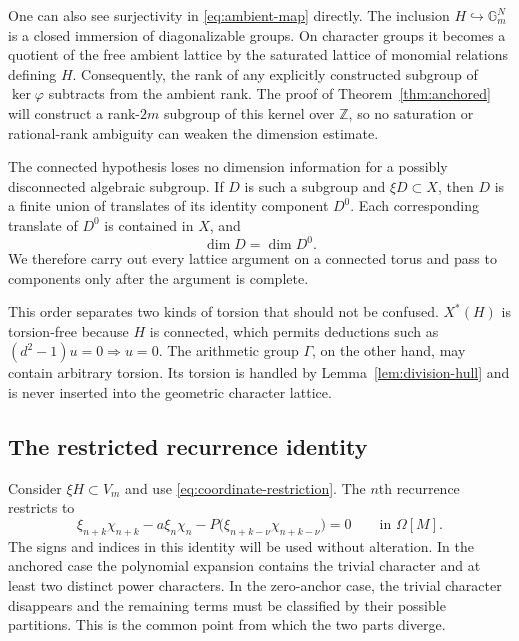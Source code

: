 \documentclass[11pt]{article}
\theoremstyle{definition}
\theoremstyle{remark}
\newcommand{\Gm}{\mathbb{G}_{m}}
\newcommand{\Om}{\Omega}
\newcommand{\Z}{\mathbb{Z}}
\newcommand{\Gam}{\Gamma}
\begin{document}
One can also see surjectivity in \eqref{eq:ambient-map} directly.  The
inclusion $H\hookrightarrow\Gm^N$ is a closed immersion of diagonalizable
groups.  On character groups it becomes a quotient of the free ambient
lattice by the saturated lattice of monomial relations defining $H$.
Consequently, the rank of any explicitly constructed subgroup of
$\ker\varphi$ subtracts from the ambient rank.  The proof of
Theorem~\ref{thm:anchored} will construct a rank-$2m$ subgroup of this kernel
over $\Z$, so no saturation or rational-rank ambiguity can weaken the
dimension estimate.

The connected hypothesis loses no dimension information for a possibly disconnected algebraic subgroup.  If $D$ is such a subgroup and $\xi D\subset X$, then $D$ is a finite union of translates of its identity component $D^0$.  Each corresponding translate of $D^0$ is contained in $X$, and
\begin{equation}
\dim D=\dim D^0.
\label{eq:component-dimension}
\end{equation}
We therefore carry out every lattice argument on a connected torus and pass to components only after the argument is complete.

This order separates two kinds of torsion that should not be confused.
$X^*(H)$ is torsion-free because $H$ is connected, which permits deductions
such as $(d^2-1)u=0\Rightarrow u=0$.  The arithmetic group $\Gam$, on the
other hand, may contain arbitrary torsion.  Its torsion is handled by
Lemma~\ref{lem:division-hull} and is never inserted into the geometric
character lattice.

\subsection{The restricted recurrence identity}

Consider $\xi H\subset V_m$ and use \eqref{eq:coordinate-restriction}.  The $n$th recurrence restricts to
\begin{equation}
\xi_{n+k}\chi_{n+k}
-a\xi_n\chi_n
-P\bigl(\xi_{n+k-\nu}\chi_{n+k-\nu}\bigr)=0
\qquad\text{in }\Om[M].
\label{eq:restricted-recurrence}
\end{equation}
The signs and indices in this identity will be used without alteration.  In the anchored case the polynomial expansion contains the trivial character and at least two distinct power characters.  In the zero-anchor case, the trivial character disappears and the remaining terms must be classified by their possible partitions.  This is the common point from which the two parts diverge.
\end{document}
